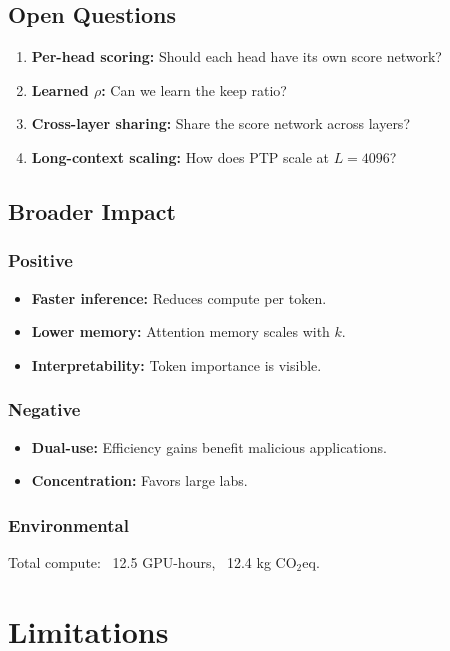 \subsection{Open Questions}

\begin{enumerate}
\item \textbf{Per-head scoring:} Should each head have its own score network?
\item \textbf{Learned $\rho$:} Can we learn the keep ratio?
\item \textbf{Cross-layer sharing:} Share the score network across layers?
\item \textbf{Long-context scaling:} How does PTP scale at $L = 4096$?

\end{enumerate}
\subsection{Broader Impact}

\subsubsection{Positive}
\begin{itemize}
\item \textbf{Faster inference:} Reduces compute per token.
\item \textbf{Lower memory:} Attention memory scales with $k$.
\item \textbf{Interpretability:} Token importance is visible.

\end{itemize}
\subsubsection{Negative}
\begin{itemize}
\item \textbf{Dual-use:} Efficiency gains benefit malicious applications.
\item \textbf{Concentration:} Favors large labs.

\end{itemize}
\subsubsection{Environmental}
Total compute: ~12.5 GPU-hours, ~12.4 kg CO$_2$eq.




\section{Limitations}

